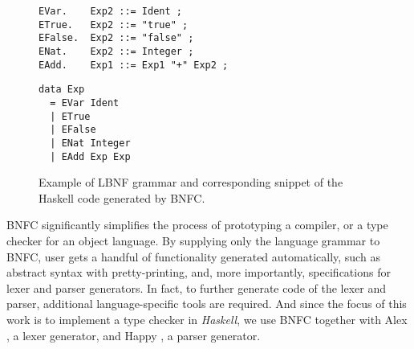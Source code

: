\begin{figure}[H]
  \centering
  \begin{minipage}{0.49\textwidth}
    \begin{verbatim}
EVar.    Exp2 ::= Ident ;
ETrue.   Exp2 ::= "true" ;
EFalse.  Exp2 ::= "false" ;
ENat.    Exp2 ::= Integer ;
EAdd.    Exp1 ::= Exp1 "+" Exp2 ;
    \end{verbatim}
    \hfill
  \end{minipage}
  \begin{minipage}{0.49\textwidth}
    \begin{verbatim}
data Exp
  = EVar Ident
  | ETrue 
  | EFalse
  | ENat Integer
  | EAdd Exp Exp
    \end{verbatim}
  \end{minipage}
  \caption{Example of LBNF grammar and corresponding snippet of the Haskell code generated by BNFC.}
  \label{fig:lbnf-bnfc-example}
\end{figure}

BNFC significantly simplifies the process of prototyping a compiler, or a type checker for an object language. By supplying only the language grammar to BNFC, user gets a handful of functionality generated automatically, such as abstract syntax with pretty-printing, and, more importantly, specifications for lexer and parser generators. In fact, to further generate code of the lexer and parser, additional language-specific tools are required. And since the focus of this work is to implement a type checker in \textit{Haskell}, we use BNFC together with Alex \cite{haskell_alex}, a lexer generator, and Happy \cite{haskell_happy}, a parser generator.
